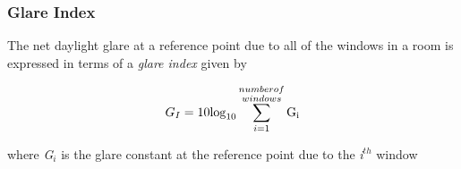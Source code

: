 \subsubsection{Glare Index}\label{glare-index}

The net daylight glare at a reference point due to all of the windows in a room is expressed in terms of a \emph{glare index} given by

\begin{equation}
{G_I} = 10{\log_{10}}\sum\limits_{i = 1}^{\scriptstyle \substack{number of \\ windows}} {{{\rm{G}}_{\rm{i}}}}
\end{equation}

where \emph{G\(_{i}\)} is the glare constant at the reference point due to the \emph{i\(^{th}\)} window
